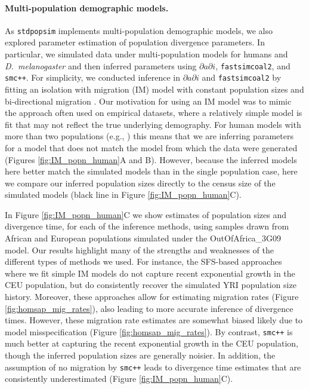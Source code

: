 \documentclass[12pt,halfline,a4paper]{ouparticle}
\newcommand{\stdpopsim}{\texttt{stdpopsim}\xspace}
\newcommand{\dadi}{$\partial a \partial i$\xspace}
\newcommand{\smcpp}{\texttt{smc++}\xspace}
\newcommand{\fastsimcoal}{\texttt{fastsimcoal2}\xspace}
\begin{document}
\paragraph*{Multi-population demographic models.}
As \stdpopsim implements multi-population demographic models, we also
explored parameter estimation of population divergence parameters. In particular,
we simulated data under multi-population models for humans and \textit{D.~melanogaster}
and then inferred  parameters using \dadi, \fastsimcoal, and \smcpp.
For simplicity, we conducted inference in \dadi and \fastsimcoal by fitting an isolation with migration (IM) model
with constant population sizes and bi-directional migration \citep{hey2004im}. Our motivation for using
an IM model was to mimic the approach often used on empirical datasets, where a relatively
simple model is fit that may not reflect the true underlying demography.
For human models with more than two populations (e.g., \cite{gutenkunst2009inferring})
this means that we are inferring parameters for a model that does
not match the model from which the data were generated (Figures
\ref{fig:IM_popn_human}A and B). However, because the inferred models here better
match the simulated models than in the single population case, here we compare
our inferred population sizes directly to the census size of the simulated models (black line in
Figure \ref{fig:IM_popn_human}C).

In Figure \ref{fig:IM_popn_human}C we show estimates of population sizes and divergence
time, for each of the inference methods, using samples drawn from African and European populations
simulated under the OutOfAfrica\_3G09 model. Our results highlight many
of the strengths and weaknesses of the different types of methods we used.
For instance, the SFS-based approaches where we fit simple IM models do not capture
recent exponential growth in the CEU population, but do consistently recover the
simulated YRI population size history. Moreover, these approaches allow for estimating
migration rates (Figure \ref{fig:homsap_mig_rates}), also leading to more accurate inference
of divergence times. However, these migration rate estimates are somewhat biased likely
due to model misspecification (Figure \ref{fig:homsap_mig_rates}).
By contrast, \smcpp is much better at capturing the recent exponential
growth in the CEU population, though the inferred population sizes are generally 
noisier. In addition, the assumption of no migration by \smcpp leads to divergence time
estimates that are consistently underestimated (Figure \ref{fig:IM_popn_human}C).
\end{document}
